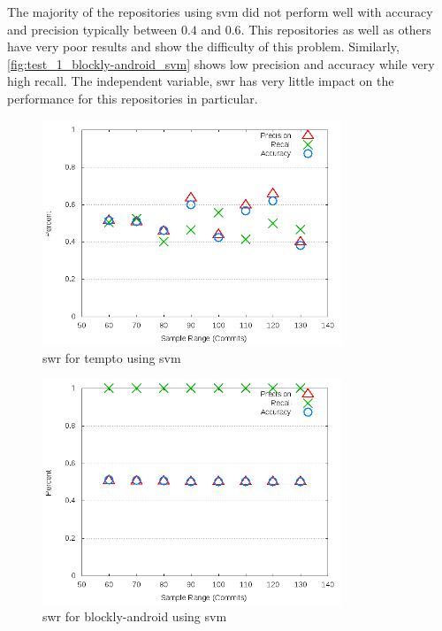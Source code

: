 

The majority of the repositories using \gls{svm} did not perform well with accuracy and precision typically between $0.4$ and $0.6$. This repositories as well as others have very poor results and show the difficulty of this problem. Similarly, \autoref{fig:test_1_blockly-android_svm} shows low precision and accuracy while very high recall. The independent variable, \gls{swr} has very little impact on the performance for this repositories in particular.


\begin{figure}[!ht]
    \centering

        \includegraphics[width=0.8\textwidth]{images/svm/test_1/tempto_sample_range}
        \caption{\gls{swr} for tempto using \gls{svm}}
        \label{fig:test_1_tempto_svm}
\end{figure}

\begin{figure}[!ht]
    \centering

        \includegraphics[width=0.8\textwidth]{images/svm/test_1/blockly-android_sample_range}
        \caption{\gls{swr} for blockly-android using \gls{svm}}
        \label{fig:test_1_blockly-android_svm}
\end{figure}

